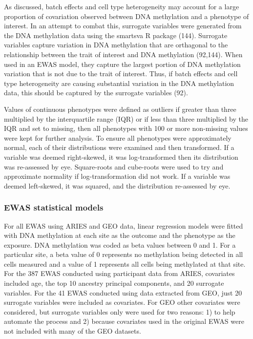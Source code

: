 \documentclass[11pt,oneside]{bristolthesis}
\begin{document}
As discussed, batch effects and cell type heterogeneity may account for a large proportion of covariation observed between DNA methylation and a phenotype of interest. In an attempt to combat this, surrogate variables were generated from the DNA methylation data using the smartsva R package (144). Surrogate variables capture variation in DNA methylation that are orthagonal to the relationship between the trait of interest and DNA methylation (92,144). When used in an EWAS model, they capture the largest portion of DNA methylation variation that is not due to the trait of interest. Thus, if batch effects and cell type heterogeneity are causing substantial variation in the DNA methylation data, this should be captured by the surrogate variables (92).

Values of continuous phenotypes were defined as outliers if greater than three multiplied by the interquartile range (IQR) or if less than three multiplied by the IQR and set to missing, then all phenotypes with 100 or more non-missing values were kept for further analysis. To ensure all phenotypes were approximately normal, each of their distributions were examined and then transformed. If a variable was deemed right-skewed, it was log-transformed then its distribution was re-assessed by eye. Square-roots and cube-roots were used to try and approximate normality if log-transformation did not work. If a variable was deemed left-skewed, it was squared, and the distribution re-assessed by eye.

\hypertarget{ewas-statistical-models}{%
\subsubsection{EWAS statistical models}\label{ewas-statistical-models}}

For all EWAS using ARIES and GEO data, linear regression models were fitted with DNA methylation at each site as the outcome and the phenotype as the exposure. DNA methylation was coded as beta values between 0 and 1. For a particular site, a beta value of 0 represents no methylation being detected in all cells measured and a value of 1 represents all cells being methylated at that site. For the 387 EWAS conducted using participant data from ARIES, covariates included age, the top 10 ancestry principal components, and 20 surrogate variables. For the 41 EWAS conducted using data extracted from GEO, just 20 surrogate variables were included as covariates. For GEO other covariates were considered, but surrogate variables only were used for two reasons: 1) to help automate the process and 2) because covariates used in the original EWAS were not included with many of the GEO datasets.
\end{document}
